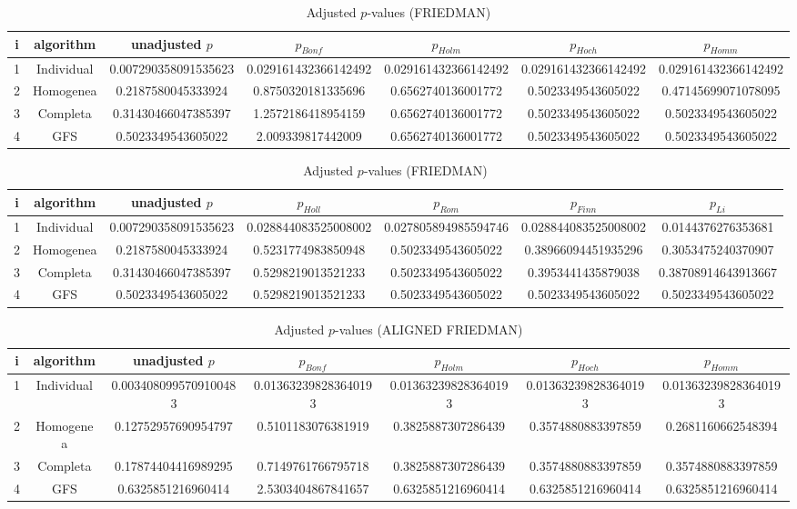 \documentclass[a4paper,10pt]{article}
\begin{document}
\begin{landscape}
\begin{table}[!htp]
\centering\scriptsize
\caption{Adjusted $p$-values (FRIEDMAN)}
\begin{tabular}{ccccccc}
i&algorithm&unadjusted $p$&$p_{Bonf}$&$p_{Holm}$&$p_{Hoch}$&$p_{Homm}$\\
\hline
1&Individual&0.007290358091535623&0.029161432366142492&0.029161432366142492&0.029161432366142492&0.029161432366142492\\
2&Homogenea&0.2187580045333924&0.8750320181335696&0.6562740136001772&0.5023349543605022&0.47145699071078095\\
3&Completa&0.31430466047385397&1.2572186418954159&0.6562740136001772&0.5023349543605022&0.5023349543605022\\
4&GFS&0.5023349543605022&2.009339817442009&0.6562740136001772&0.5023349543605022&0.5023349543605022\\
\hline
\end{tabular}
\end{table}

\begin{table}[!htp]
\centering\scriptsize
\caption{Adjusted $p$-values (FRIEDMAN)}
\begin{tabular}{ccccccc}
i&algorithm&unadjusted $p$&$p_{Holl}$&$p_{Rom}$&$p_{Finn}$&$p_{Li}$\\
\hline
1&Individual&0.007290358091535623&0.028844083525008002&0.027805894985594746&0.028844083525008002&0.0144376276353681\\
2&Homogenea&0.2187580045333924&0.5231774983850948&0.5023349543605022&0.38966094451935296&0.3053475240370907\\
3&Completa&0.31430466047385397&0.5298219013521233&0.5023349543605022&0.3953441435879038&0.38708914643913667\\
4&GFS&0.5023349543605022&0.5298219013521233&0.5023349543605022&0.5023349543605022&0.5023349543605022\\
\hline
\end{tabular}
\end{table}


\newpage

\begin{table}[!htp]
\centering\scriptsize
\caption{Adjusted $p$-values (ALIGNED FRIEDMAN)}
\begin{tabular}{ccccccc}
i&algorithm&unadjusted $p$&$p_{Bonf}$&$p_{Holm}$&$p_{Hoch}$&$p_{Homm}$\\
\hline
1&Individual&0.0034080995709100483&0.013632398283640193&0.013632398283640193&0.013632398283640193&0.013632398283640193\\
2&Homogenea&0.12752957690954797&0.5101183076381919&0.3825887307286439&0.3574880883397859&0.2681160662548394\\
3&Completa&0.17874404416989295&0.7149761766795718&0.3825887307286439&0.3574880883397859&0.3574880883397859\\
4&GFS&0.6325851216960414&2.5303404867841657&0.6325851216960414&0.6325851216960414&0.6325851216960414\\
\hline
\end{tabular}
\end{table}


\end{landscape}
\end{document}

